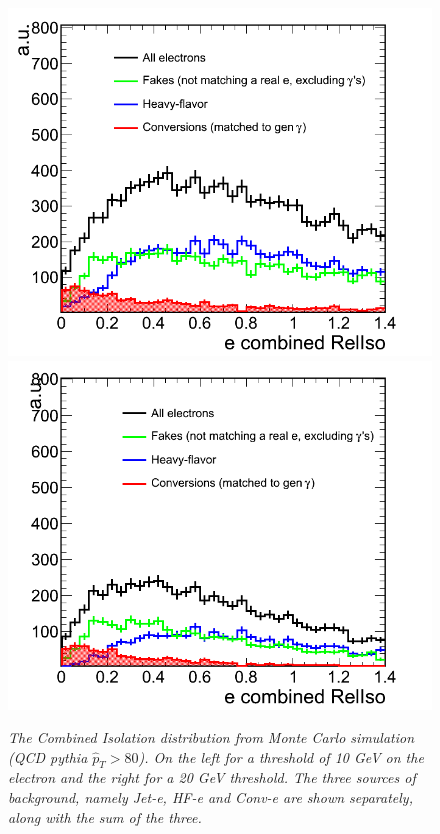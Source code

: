 \begin{figure}[h!]
\centering
\includegraphics[scale=0.32]{Plots/combIso_pt10_MC.png}
\includegraphics[scale=0.32]{Plots/combIso_pt20_MC.png}
\caption{\textit{The Combined Isolation distribution from Monte Carlo simulation  (QCD pythia $\hat{p}_{T} > 80$).  On the left for a threshold of 10 GeV on the electron and the right for a 20 GeV threshold.  The three sources of background, namely Jet-e, HF-e and Conv-e are shown separately, along with the sum of the three.}}\label{fig:combIso_MC}
\end{figure}


